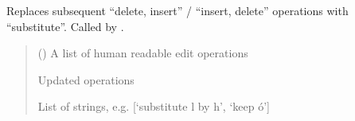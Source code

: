 \documentclass[letterpaper,10pt,english]{sphinxmanual}
\begin{document}
\begin{fulllineitems}
\label{\detokenize{documentation:loanpy.scapplier.substitute_operations}}
\pysigstartsignatures
{}
\pysigstopsignatures
\sphinxAtStartPar
Replaces subsequent “delete, insert” / “insert, delete” operations with
“substitute”. Called by .
\begin{quote}\begin{description}
\sphinxAtStartPar
{} (\sphinxstyleliteralemphasis{\sphinxupquote{, }}\sphinxstyleliteralemphasis{\sphinxupquote{ {[}}}\sphinxstyleliteralemphasis{\sphinxupquote{, }}\sphinxstyleliteralemphasis{\sphinxupquote{, }}\sphinxstyleliteralemphasis{\sphinxupquote{{]}}}) \textendash{} A list of human readable edit operations

\sphinxAtStartPar
Updated operations

\sphinxAtStartPar
List of strings, e.g. {[}‘substitute l by h’, ‘keep ó’{]}

\end{description}\end{quote}

\sphinxAtStartPar
{}


\end{fulllineitems}
\end{document}
